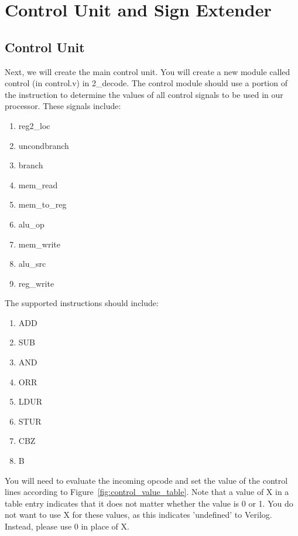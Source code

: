\chapter{Control Unit and Sign Extender}

\section{Control Unit}
Next, we will create the main control unit.  You will create a new module called control (in control.v) in 2\_decode.  The control module should use a portion of the instruction to determine the values of all control signals to be used in our processor.  These signals include:
\begin{enumerate}
\item reg2\_loc
\item uncondbranch
\item branch
\item mem\_read
\item mem\_to\_reg
\item alu\_op
\item mem\_write
\item alu\_src
\item reg\_write
\end{enumerate}

The supported instructions should include:
\begin{enumerate}
	\item ADD
	\item SUB
	\item AND
	\item ORR
	\item LDUR
	\item STUR
	\item CBZ
	\item B
\end{enumerate}

You will need to evaluate the incoming opcode and set the value of the control lines according to Figure~\ref{fig:control_value_table}.  Note that a value of X in a table entry indicates that it does not matter whether the value is 0 or 1.  You do not want to use X for these values, as this indicates 'undefined' to Verilog.  Instead, please use 0 in place of X.

